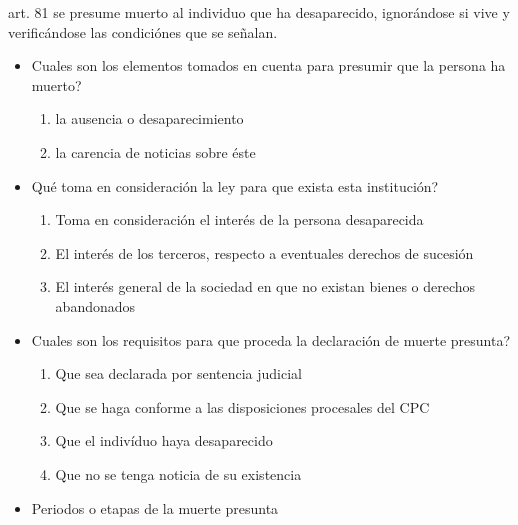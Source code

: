 \documentclass[]{article}
\providecommand{\tightlist}{%
  \setlength{\itemsep}{0pt}\setlength{\parskip}{0pt}}
\begin{document}
\begin{itemize}
\begin{itemize}
\begin{itemize}
\begin{itemize}
        art. 81 se presume muerto al individuo que ha desaparecido,
        ignorándose si vive y verificándose las condiciónes que se
        señalan.

        \begin{itemize}
        \item
          Cuales son los elementos tomados en cuenta para presumir que
          la persona ha muerto?

          \begin{enumerate}
          \def\labelenumi{\arabic{enumi}.}
          \tightlist
          \item
            la ausencia o desaparecimiento
          \item
            la carencia de noticias sobre éste
          \end{enumerate}
        \item
          Qué toma en consideración la ley para que exista esta
          institución?

          \begin{enumerate}
          \def\labelenumi{\arabic{enumi}.}
          \tightlist
          \item
            Toma en consideración el interés de la persona desaparecida
          \item
            El interés de los terceros, respecto a eventuales derechos
            de sucesión
          \item
            El interés general de la sociedad en que no existan bienes o
            derechos abandonados
          \end{enumerate}
        \item
          Cuales son los requisitos para que proceda la declaración de
          muerte presunta?

          \begin{enumerate}
          \def\labelenumi{\arabic{enumi}.}
          \tightlist
          \item
            Que sea declarada por sentencia judicial
          \item
            Que se haga conforme a las disposiciones procesales del CPC
          \item
            Que el indivíduo haya desaparecido
          \item
            Que no se tenga noticia de su existencia
          \end{enumerate}
        \item
          Periodos o etapas de la muerte presunta


\end{itemize}
\end{itemize}
\end{itemize}
\end{itemize}
\end{itemize}
\end{document}
